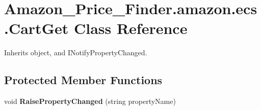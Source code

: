 \hypertarget{class_amazon___price___finder_1_1amazon_1_1ecs_1_1_cart_get}{\section{Amazon\-\_\-\-Price\-\_\-\-Finder.\-amazon.\-ecs.\-Cart\-Get Class Reference}
\label{class_amazon___price___finder_1_1amazon_1_1ecs_1_1_cart_get}
}


 




Inherits object, and I\-Notify\-Property\-Changed.

\subsection*{Protected Member Functions}
\begin{DoxyCompactItemize}
\item 
\hypertarget{class_amazon___price___finder_1_1amazon_1_1ecs_1_1_cart_get_a5dec43bea8346fc5b5ba27d7baed1886}{void {\bfseries Raise\-Property\-Changed} (string property\-Name)}\label{class_amazon___price___finder_1_1amazon_1_1ecs_1_1_cart_get_a5dec43bea8346fc5b5ba27d7baed1886}

\end{DoxyCompactItemize}
